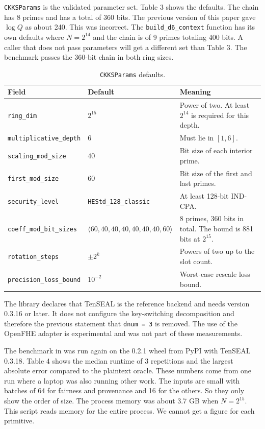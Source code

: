\documentclass[10pt,a4paper]{article}
\begin{document}
\texttt{CKKSParams} is the validated parameter set. Table 3 shows the defaults. The chain has 8 primes and has a total of 360 bits. The previous version of this paper gave $\log Q$ as about 240. This was incorrect. The \texttt{build\_d6\_context} function has its own defaults where $N=2^{14}$ and the chain is of 9 primes totaling 400 bits. A caller that does not pass parameters will get a different set than Table 3. The benchmark passes the 360-bit chain in both ring sizes.

\begin{table}[h]
\small
\caption{\texttt{CKKSParams} defaults.}
\begin{tabularx}{\textwidth}{l l Y}
\toprule
\textbf{Field} & \textbf{Default} & \textbf{Meaning} \\
\midrule
\texttt{ring\_dim}              & $2^{15}$         & Power of two. At least $2^{14}$ is required for this depth. \\
\texttt{multiplicative\_depth}  & $6$              & Must lie in $[1,6]$. \\
\texttt{scaling\_mod\_size}     & $40$             & Bit size of each interior prime. \\
\texttt{first\_mod\_size}       & $60$             & Bit size of the first and last primes. \\
\texttt{security\_level}        & \texttt{HEStd\_128\_classic} & At least 128-bit IND-CPA. \\
\texttt{coeff\_mod\_bit\_sizes} & $\langle 60, 40, 40, 40, 40, 40, 40, 60\rangle$ & 8 primes, 360 bits in total. The bound is 881 bits at $2^{15}$. \\
\texttt{rotation\_steps}        & $\pm 2^k$        & Powers of two up to the slot count. \\
\texttt{precision\_loss\_bound} & $10^{-2}$        & Worst-case rescale loss bound. \\
\bottomrule
\end{tabularx}
\end{table}

The library declares that TenSEAL is the reference backend and needs version 0.3.16 or later. It does not configure the key-switching decomposition and therefore the previous statement that \texttt{dnum = 3} is removed. The use of the OpenFHE adapter is experimental and was not part of these measurements.

The benchmark in  was run again on the 0.2.1 wheel from PyPI with TenSEAL 0.3.18. Table 4 shows the median runtime of 3 repetitions and the largest absolute error compared to the plaintext oracle. These numbers come from one run where a laptop was also running other work. The inputs are small with batches of 64 for fairness and provenance and 16 for the others. So they only show the order of size. The process memory was about 3.7 GB when $N=2^{15}$. This script reads memory for the entire process. We cannot get a figure for each primitive.
\end{document}

